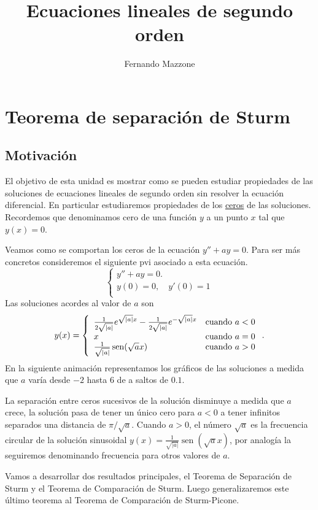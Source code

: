 \documentclass{article}
\title{Ecuaciones lineales de segundo orden}
\author{Fernando Mazzone}
\DeclareMathOperator{\sen}{sen}
\begin{document}
\section{Teorema de separación de Sturm}
\subsection{Motivación}


El objetivo  de esta unidad es mostrar como se pueden estudiar propiedades de las soluciones de ecuaciones lineales de segundo orden sin resolver la ecuación diferencial. En particular estudiaremos propiedades de  los \href{http://es.wikipedia.org/wiki/Raíz_de_una_función}{ceros} de las soluciones. Recordemos que denominamos cero de una función $y$ a un punto $x$ tal que $y(x)=0$.

Veamos como se comportan los ceros de la ecuación $y''+ay=0$. Para ser más concretos consideremos el siguiente pvi asociado a esta ecuación.
\[\left\{\begin{array}{l}
    y''+ay=0.\\
    y(0)=0,\quad y'(0)=1\\
  \end{array}\right.
  \]
Las soluciones  acordes al valor de $a$ son
\[
y(x)=\left\{\begin{array}{l l}
    \frac{1}{2\sqrt{|a|}}e^{\sqrt{|a|}x}- \frac{1}{2\sqrt{|a|}}e^{-\sqrt{|a|}x} &\text{cuando } a<0\\
     x &\text{cuando } a=0\\
     \frac{1}{\sqrt{|a|}}\sen(\sqrt{a}x) &\text{cuando } a>0\\
\end{array}\right..
\]
En la siguiente animación representamos los gráficos de las soluciones a medida que $a$ varía desde $-2$ hasta $6$ de a saltos de $0.1$.  
\begin{center}
\end{center}
La separación entre ceros sucesivos de la  solución disminuye a medida que $a$ crece, la solución pasa de tener un único cero para $a<0$  a tener infinitos separados una distancia de $\pi/\sqrt{a}$. Cuando $a>0$, el número $\sqrt{a}$ es la frecuencia circular  de la solución sinusoidal $y(x)=   \frac{1}{\sqrt{|a|}}\sen(\sqrt{a}x)$, por analogía la seguiremos denominando frecuencia para otros valores de $a$.   

Vamos a desarrollar dos resultados principales, el Teorema de Separación de Sturm y el Teorema de Comparación de Sturm. Luego generalizaremos este último teorema al Teorema de Comparación de Sturm-Picone.
\end{document}
